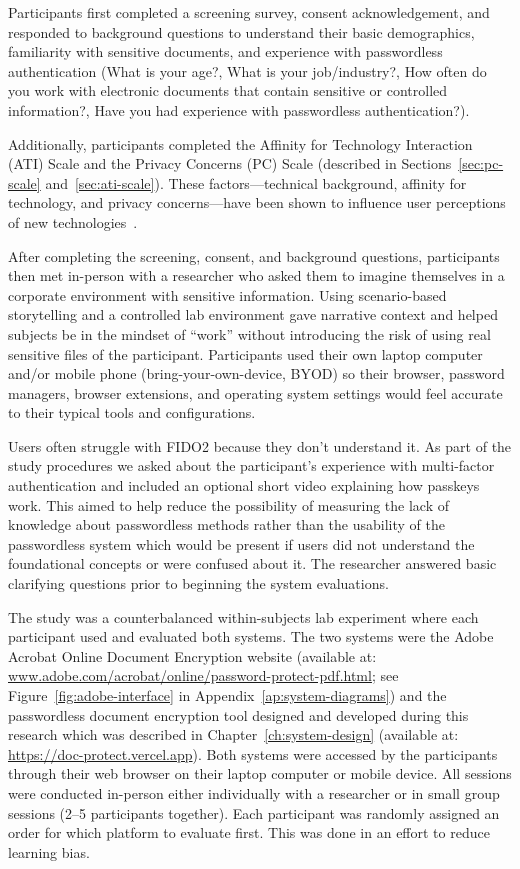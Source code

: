 

Participants first completed a screening survey, consent acknowledgement, and responded to background questions to understand their basic demographics, familiarity with sensitive documents, and experience with passwordless authentication (What is your age?, What is your job/industry?, How often do you work with electronic documents that contain sensitive or controlled information?, Have you had experience with passwordless authentication?).

Additionally, participants completed the Affinity for Technology Interaction (ATI) Scale and the Privacy Concerns (PC) Scale (described in Sections~\ref{sec:pc-scale} and~\ref{sec:ati-scale}). These factors---technical background, affinity for technology, and privacy concerns---have been shown to influence user perceptions of new technologies~\cite{lyastani_fido2_2020,wursching_fido2_2023}.

After completing the screening, consent, and background questions, participants then met in-person with a researcher who asked them to imagine themselves in a corporate environment with sensitive information. Using scenario-based storytelling and a controlled lab environment gave narrative context and helped subjects be in the mindset of ``work'' without introducing the risk of using real sensitive files of the participant. Participants used their own laptop computer and/or mobile phone (bring-your-own-device, BYOD) so their browser, password managers, browser extensions, and operating system settings would feel accurate to their typical tools and configurations.

Users often struggle with FIDO2 because they don't understand it. As part of the study procedures we asked about the participant's experience with multi-factor authentication and included an optional short video explaining how passkeys work. This aimed to help reduce the possibility of measuring the lack of knowledge about passwordless methods rather than the usability of the passwordless system which would be present if users did not understand the foundational concepts or were confused about it. The researcher answered basic clarifying questions prior to beginning the system evaluations.

The study was a counterbalanced within-subjects lab experiment where each participant used and evaluated both systems. The two systems were the Adobe Acrobat Online Document Encryption website (available at: \url{www.adobe.com/acrobat/online/password-protect-pdf.html}; see Figure~\ref{fig:adobe-interface} in Appendix~\ref{ap:system-diagrams}) and the passwordless document encryption tool designed and developed during this research which was described in Chapter~\ref{ch:system-design} (available at: \url{https://doc-protect.vercel.app}). Both systems were accessed by the participants through their web browser on their laptop computer or mobile device. All sessions were conducted in-person either individually with a researcher or in small group sessions (2--5 participants together). Each participant was randomly assigned an order for which platform to evaluate first. This was done in an effort to reduce learning bias.

